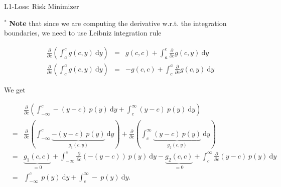 \documentclass[11pt,compress,t,notes=noshow, xcolor=table]{beamer}
\begin{document}
\begin{vbframe}{L1-Loss: Risk Minimizer}
\begin{footnotesize}
\framebreak 

$^\ast$ \textbf{Note} that since we are computing the derivative w.r.t. the integration boundaries, we need to use Leibniz integration rule 

\begin{eqnarray*}
  \frac{\partial}{\partial c} \left(\int_a^c g(c, y) ~\text{d}y\right) &=& g(c, c) + \int_a^c \frac{\partial}{\partial c} g(c, y) ~\text{d}y \\
  \frac{\partial}{\partial c} \left(\int_c^a g(c, y) ~\text{d}y\right) &=& - g(c, c) + \int_c^a \frac{\partial}{\partial c} g(c, y) ~\text{d}y    
\end{eqnarray*}

We get 

\vspace*{-0.3cm}

\begin{eqnarray*}
&&\frac{\partial}{\partial c} \left(\int_{-\infty}^c -(y - c)~p(y)~\text{d}y + \int_c^\infty (y - c)~p(y)~\text{d}y \right) \\
&=& \frac{\partial}{\partial c} \left(\int_{-\infty}^c \underbrace{-(y - c)~p(y)}_{g_1(c, y)}~\text{d}y\right) + \frac{\partial}{\partial c} \left(\int_c^\infty \underbrace{(y - c)~p(y)}_{g_2(c, y)}~\text{d}y \right) \\
&=& \underbrace{g_1(c, c)}_{=0} + \int_{-\infty}^c \frac{\partial}{\partial c}  \left(-(y - c)\right)~p(y)~\text{d}y - \underbrace{g_2(c, c)}_{= 0} + \int_c^\infty \frac{\partial}{\partial c}  (y - c)~p(y)~\text{d}y \\
&=& \int_{-\infty}^c  ~p(y)~\text{d}y + \int_c^\infty -~p(y)~\text{d}y. 
\end{eqnarray*}

\end{footnotesize}

\end{vbframe}
\end{document}
